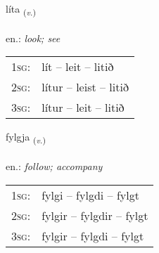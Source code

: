 \documentclass[frontgrid, backgrid]{flacards}\usepackage[]{graphicx}\usepackage[]{xcolor}
\begin{document}
{líta \small{\textsubscript{(\textit{v.})}} \\[1ex] %
\textphonetic{[liːta]} \\
en.: \emph{look; see} \\  [2ex]
\renewcommand*{\arraystretch}{0.8}
\begin{tabular}{p{1cm}l}
\textsc{1sg}: & lít -- leit -- litið \\ 
\textsc{2sg}: & lítur -- leist -- litið \\ 
\textsc{3sg}: & lítur -- leit -- litið \\ 
\end{tabular}
}

\renewcommand{\flhead}{\vskip5pt \fboxsep=0pt {\small\bfseries\footnotesize Sagnorð | Verb}}
\renewcommand{\fcfoot}{\vskip5pt \fboxsep=0pt \hspace{2pt}{\small\bfseries\footnotesize 1K}}

\renewcommand{\blhead}{\vskip5pt {\small\bfseries\footnotesize Sagnorð | Verb }}
\renewcommand{\bcfoot}{\vskip5pt \hspace{2pt}{\small\bfseries\footnotesize 1K}}


{fylgja \small{\textsubscript{(\textit{v.})}} \\[1ex] %
\textphonetic{[fɪlca]} \\
en.: \emph{follow; accompany} \\  [2ex]
\renewcommand*{\arraystretch}{0.8}
\begin{tabular}{p{1cm}l}
\textsc{1sg}: & fylgi -- fylgdi -- fylgt \\ 
\textsc{2sg}: & fylgir -- fylgdir -- fylgt \\ 
\textsc{3sg}: & fylgir -- fylgdi -- fylgt \\ 
\end{tabular}
}

\renewcommand{\flhead}{\vskip5pt \fboxsep=0pt {\small\bfseries\footnotesize Nafnorð | Noun}}
\renewcommand{\fcfoot}{\vskip5pt \fboxsep=0pt \hspace{2pt}{\small\bfseries\footnotesize 1K}}
\end{document}
